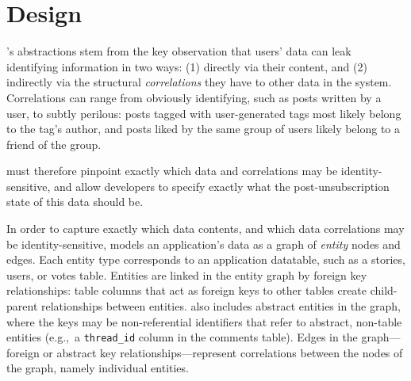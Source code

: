 \section{Design}

\sys's abstractions stem from the key observation that users' data can leak identifying information
in two ways: (1) directly via their content, and (2) indirectly via the structural
\emph{correlations} they have to other data in the system.  Correlations can range from obviously
identifying, such as posts written by a user, to subtly perilous: posts tagged with user-generated
tags most likely belong to the tag's author, and posts liked by the same group of users likely
belong to a friend of the group.

\sys must therefore pinpoint exactly which data and correlations may be
identity-sensitive, and allow developers to specify exactly what the post-unsubscription state of
this data should be.

%
%

In order to capture exactly which data contents, and which data correlations may be
identity-sensitive, \sys models an application's data as a graph of \emph{entity} nodes and edges.
Each entity type corresponds to an application datatable, such as a stories, users, or votes table.
Entities are linked in the entity graph by foreign key relationships: table columns that act as
foreign keys to other tables create child-parent relationships between entities.  \sys also includes
abstract entities in the graph, where the keys may be non-referential identifiers that refer to
abstract, non-table entities (e.g.,\ a \texttt{thread\_id} column in the comments table).  Edges in
the graph---foreign or abstract key relationships---represent correlations between the nodes of the
graph, namely individual entities.

